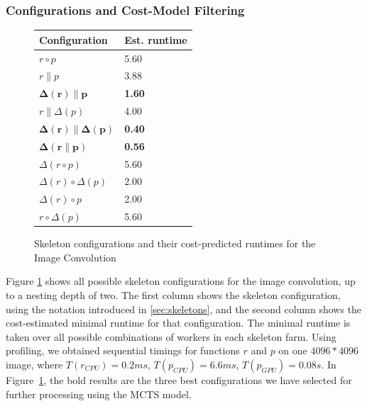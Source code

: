 \documentclass[smallextended]{svjour3}
\begin{document}
\subsubsection{Configurations and Cost-Model Filtering}
\begin{figure}[t]
\begin{center}
\begin{tabular}{| l | l |}
\hline
 Configuration & Est. runtime \tabularnewline
\hline
\hline
$ r \circ p $ & 5.60  \tabularnewline
\hline
$r \parallel p$ & 3.88 \tabularnewline
\hline
$ \mathbf{\Delta(r) \parallel p}$ & \textbf{1.60} \tabularnewline
\hline
$ r \parallel \Delta(p)$ & 4.00 \tabularnewline
\hline
$\mathbf{\Delta(r) \parallel \Delta(p)}$ & \textbf{0.40}  \tabularnewline
\hline
$\mathbf{\Delta(r \parallel p)}$ & \textbf{0.56}  \tabularnewline
\hline
$\Delta(r \circ p)$ & 5.60  \tabularnewline
\hline
$\Delta(r) \circ \Delta(p)$ & 2.00  \tabularnewline
\hline
$\Delta(r) \circ p$ & 2.00 \tabularnewline
\hline
$r \circ \Delta(p)$ & 5.60 \tabularnewline
\hline
\end{tabular}
\caption{Skeleton configurations and their cost-predicted runtimes for
  the Image Convolution}
\label{fig:configsConvolution}
\end{center}
\end{figure}
\noindent

Figure \ref{fig:configsConvolution}  shows all possible
skeleton configurations for the image convolution, up to a nesting depth of two. The first column shows the skeleton configuration, using the
notation introduced in \ref{sec:skeletons}, and the second column shows the
cost-estimated minimal runtime for that configuration. 
The minimal runtime is taken over all possible combinations of workers in each skeleton farm.
Using profiling, we obtained
sequential timings for functions $r$ and $p$ on one $4096*4096$ image, where
$T(r_{CPU})=0.2ms$, $T(p_{CPU})=6.6ms$, $T(p_{GPU})=0.08s$.
In Figure~\ref{fig:configsConvolution}, the bold results are the three best configurations we have selected for further
processing using the MCTS model.


\end{document}
